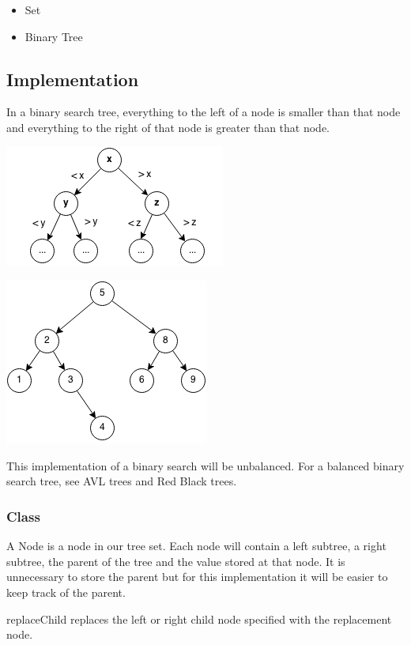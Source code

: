 \documentclass[11pt,oneside]{book}
\makeatletter
\def\maxwidth#1{\ifdim\Gin@nat@width>#1 #1\else\Gin@nat@width\fi}
\makeatother
\begin{document}
\begin{itemize}
\item Set
\item Binary Tree
\end{itemize}

\subsection{Implementation}

In a binary search tree, everything to the left of a node is smaller than that node and everything to the right of that node is greater than that node.

\includegraphics[width=\maxwidth{\textwidth}]{bstcompare.png}

\includegraphics[width=\maxwidth{\textwidth}]{bst.png}

This implementation of a binary search will be unbalanced. For a balanced binary search tree, see AVL trees and Red Black trees.

\subsubsection{Class}

A Node is a node in our tree set. Each node will contain a left subtree, a right subtree, the parent of the tree and the value stored at that node. It is unnecessary to store the parent but for this implementation it will be easier to keep track of the parent.

replaceChild replaces the left or right child node specified with the replacement node.
\end{document}
